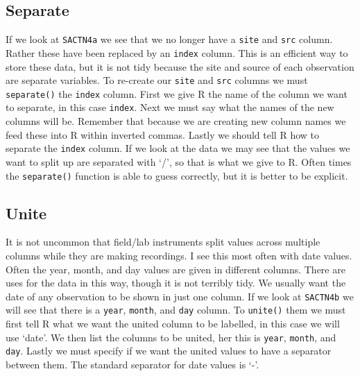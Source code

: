 \documentclass[]{book}
\newenvironment{Shaded}{\begin{snugshade}}{\end{snugshade}}
\newcommand{\KeywordTok}[1]{\textcolor[rgb]{0.13,0.29,0.53}{\textbf{#1}}}
\newcommand{\DataTypeTok}[1]{\textcolor[rgb]{0.13,0.29,0.53}{#1}}
\newcommand{\StringTok}[1]{\textcolor[rgb]{0.31,0.60,0.02}{#1}}
\newcommand{\OperatorTok}[1]{\textcolor[rgb]{0.81,0.36,0.00}{\textbf{#1}}}
\newcommand{\NormalTok}[1]{#1}
\theoremstyle{definition}
\theoremstyle{definition}
\theoremstyle{definition}
\theoremstyle{remark}
\begin{document}
\subsection{Separate}\label{separate}

If we look at \texttt{SACTN4a} we see that we no longer have a
\texttt{site} and \texttt{src} column. Rather these have been replaced
by an \texttt{index} column. This is an efficient way to store these
data, but it is not tidy because the site and source of each observation
are separate variables. To re-create our \texttt{site} and \texttt{src}
columns we must \texttt{separate()} the \texttt{index} column. First we
give R the name of the column we want to separate, in this case
\texttt{index}. Next we must say what the names of the new columns will
be. Remember that because we are creating new column names we feed these
into R within inverted commas. Lastly we should tell R how to separate
the \texttt{index} column. If we look at the data we may see that the
values we want to split up are separated with `/', so that is what we
give to R. Often times the \texttt{separate()} function is able to guess
correctly, but it is better to be explicit.

\begin{Shaded}
\end{Shaded}

\subsection{Unite}\label{unite}

It is not uncommon that field/lab instruments split values across
multiple columns while they are making recordings. I see this most often
with date values. Often the year, month, and day values are given in
different columns. There are uses for the data in this way, though it is
not terribly tidy. We usually want the date of any observation to be
shown in just one column. If we look at \texttt{SACTN4b} we will see
that there is a \texttt{year}, \texttt{month}, and \texttt{day} column.
To \texttt{unite()} them we must first tell R what we want the united
column to be labelled, in this case we will use `date'. We then list the
columns to be united, her this is \texttt{year}, \texttt{month}, and
\texttt{day}. Lastly we must specify if we want the united values to
have a separator between them. The standard separator for date values is
`-'.
\end{document}
